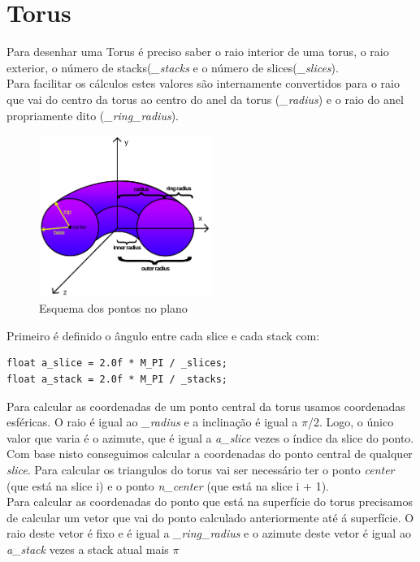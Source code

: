 \documentclass[a4paper]{report}
\begin{document}
\section{Torus}
Para desenhar uma Torus é preciso saber o raio interior de uma torus, o raio
exterior, o número de stacks(\textit{\_stacks} e o número de
slices(\textit{\_slices}).\\
Para facilitar os cálculos estes valores são internamente convertidos para o
raio que vai do centro da torus ao centro do anel da torus (\textit{\_radius}) e
o raio do anel propriamente dito (\textit{\_ring\_radius}).

\begin{figure}[H]
    \centering 
    \includegraphics[width=0.5\textwidth]{images/torus_points.png}
    \caption{Esquema dos pontos no plano}
\end{figure}
Primeiro é definido o ângulo entre cada slice e cada stack com:
\begin{lstlisting}
float a_slice = 2.0f * M_PI / _slices;
float a_stack = 2.0f * M_PI / _stacks;
\end{lstlisting}
Para calcular as coordenadas de um ponto central da torus usamos coordenadas
esféricas. O raio é igual ao \textit{\_radius} e a inclinação é igual a $\pi$/2.
Logo, o único valor que varia é o azimute, que é igual a \textit{a\_slice} vezes
o índice da slice do ponto.\\
Com base nisto conseguimos calcular a coordenadas do ponto central de qualquer
\textit{slice}. Para calcular os triangulos do torus vai ser necessário ter o
ponto \textit{center} (que está na slice i) e o ponto \textit{n\_center} (que
está na slice i + 1).\\
Para calcular as coordenadas do ponto que está na superfície do torus precisamos
de calcular um vetor que vai do ponto calculado anteriormente até á
superfície. O raio deste vetor é fixo e é igual a \textit{\_ring\_radius} e o
azimute deste vetor é igual ao \textit{a\_stack} vezes a stack atual mais $\pi$
\end{document}

